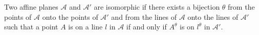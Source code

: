 Two affine planes $\mathcal{A}$ and $\mathcal{A}'$ are isomorphic if there exists a bijection $\theta$ from the points of $\mathcal{A}$ onto the points of $\mathcal{A}'$ and from the lines of $\mathcal{A}$ onto the lines of $\mathcal{A}'$ such that a point $A$ is on a line $l$ in $\mathcal{A}$ if and only if $A^\theta$ is on $l^\theta$ in $\mathcal{A}'$.
